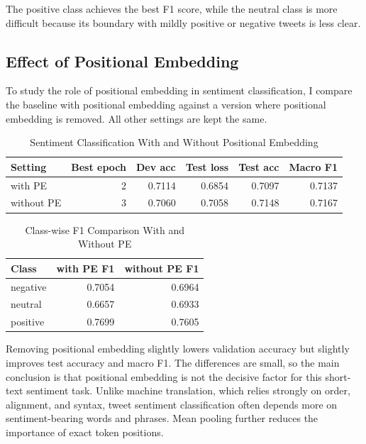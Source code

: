 \documentclass[a4paper,12pt]{article}
\begin{document}
The positive class achieves the best F1 score, while the neutral class is more difficult because its boundary with mildly positive or negative tweets is less clear.

\subsection{Effect of Positional Embedding}

To study the role of positional embedding in sentiment classification, I compare the baseline with positional embedding against a version where positional embedding is removed. All other settings are kept the same.

\begin{table}[H]
\centering
\caption{Sentiment Classification With and Without Positional Embedding}
\label{tab:sentiment-pe-overall-en}
\begin{tabular}{lrrrrr}
\toprule
Setting & Best epoch & Dev acc & Test loss & Test acc & Macro F1 \\
\midrule
with PE & 2 & 0.7114 & 0.6854 & 0.7097 & 0.7137 \\
without PE & 3 & 0.7060 & 0.7058 & 0.7148 & 0.7167 \\
\bottomrule
\end{tabular}
\end{table}

\begin{table}[H]
\centering
\caption{Class-wise F1 Comparison With and Without PE}
\label{tab:sentiment-pe-class-en}
\begin{tabular}{lrr}
\toprule
Class & with PE F1 & without PE F1 \\
\midrule
negative & 0.7054 & 0.6964 \\
neutral & 0.6657 & 0.6933 \\
positive & 0.7699 & 0.7605 \\
\bottomrule
\end{tabular}
\end{table}

Removing positional embedding slightly lowers validation accuracy but slightly improves test accuracy and macro F1. The differences are small, so the main conclusion is that positional embedding is not the decisive factor for this short-text sentiment task. Unlike machine translation, which relies strongly on order, alignment, and syntax, tweet sentiment classification often depends more on sentiment-bearing words and phrases. Mean pooling further reduces the importance of exact token positions.
\end{document}
